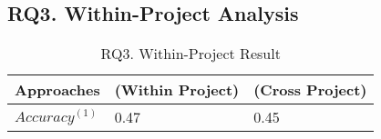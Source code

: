 \subsection{RQ3. Within-Project Analysis}

\begin{table}[t]
	\caption{RQ3. Within-Project Result}
	\vspace{-0.1in}
	\begin{center}
		\footnotesize
		\tabcolsep 4pt
		\renewcommand{\arraystretch}{1} \begin{tabular}{p{1.4cm}<{\centering}|p{3cm}<{\centering}|p{3cm}<{\centering}}
			
			\hline
			Approaches          & \tool (Within Project) & \tool (Cross Project)\\
			\hline
			$Accuracy^{(1)}$   &      0.47          &		0.45	       \\

			\hline
		\end{tabular}
		\label{RQ3-result}
	\end{center}
\end{table}
